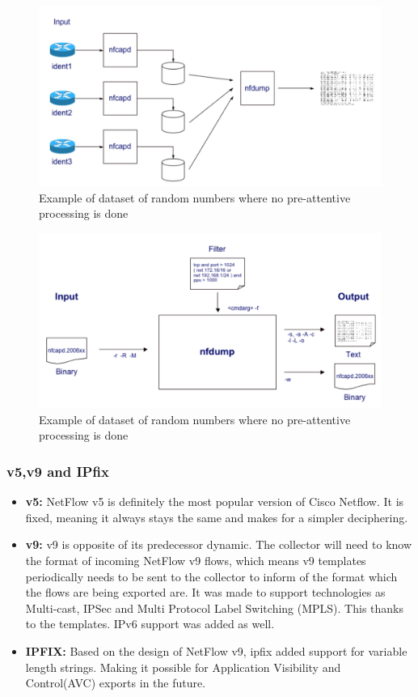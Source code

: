\begin{figure}[h!]
\includegraphics[scale=0.4]{nfdump_operation}
\caption{Example of dataset of random numbers where no pre-attentive processing is done}
\label{nfdump_operation}
\end{figure}

\begin{figure}[h!]
\includegraphics[scale=0.4]{nfdump2}
\caption{Example of dataset of random numbers where no pre-attentive processing is done}
\label{nfdump_processing}
\end{figure}

\subsubsection{v5,v9 and IPfix}
\begin{itemize}
\item \textbf{v5:} NetFlow v5 is definitely the most popular version of Cisco Netflow. It is fixed, meaning it always stays the same and makes for a simpler deciphering. 

\item \textbf{v9:} v9 is opposite of its predecessor dynamic. The collector will need to know the format of incoming NetFlow v9 flows, which means v9 templates periodically needs to be sent to the collector to inform of the format which the flows are being exported are. It was made to support technologies as Multi-cast, IPSec and Multi Protocol Label Switching (MPLS). This thanks to the templates. IPv6 support was added as well. \cite{v9}

\item \textbf{IPFIX:} Based on the design of NetFlow v9, \gls{ipfix} added support for variable length strings. Making it possible for Application Visibility and Control(AVC) exports in the future. \cite{ipfix}
\end{itemize}

